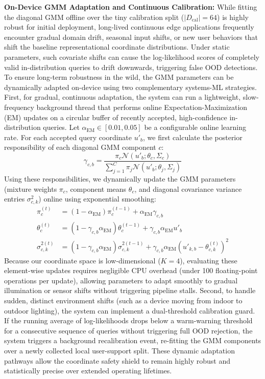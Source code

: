 \textbf{On-Device GMM Adaptation and Continuous Calibration:} While fitting the diagonal GMM offline over the tiny calibration split ($|D_{\text{cal}}| = 64$) is highly robust for initial deployment, long-lived continuous edge applications frequently encounter gradual domain drift, seasonal input shifts, or new user behaviors that shift the baseline representational coordinate distributions. Under static parameters, such covariate shifts can cause the log-likelihood scores of completely valid in-distribution queries to drift downwards, triggering false OOD detections. To ensure long-term robustness in the wild, the GMM parameters can be dynamically adapted on-device using two complementary systems-ML strategies. First, for gradual, continuous adaptation, the system can run a lightweight, slow-frequency background thread that performs online Expectation-Maximization (EM) updates on a circular buffer of recently accepted, high-confidence in-distribution queries. Let $\alpha_{\text{EM}} \in [0.01, 0.05]$ be a configurable online learning rate. For each accepted query coordinate $u'_b$, we first calculate the posterior responsibility of each diagonal GMM component $c$:
\begin{equation}
  \gamma_{c, b} = \frac{\pi_c \mathcal{N}(u'_b; \theta_c, \Sigma_c)}{\sum_{j=1}^C \pi_j \mathcal{N}(u'_b; \theta_j, \Sigma_j)}
\end{equation}
Using these responsibilities, we dynamically update the GMM parameters (mixture weights $\pi_c$, component means $\theta_c$, and diagonal covariance variance entries $\sigma_{c, k}^2$) online using exponential smoothing:
\begin{align}
  \pi_c^{(t)} &= (1 - \alpha_{\text{EM}}) \pi_c^{(t-1)} + \alpha_{\text{EM}} \gamma_{c, b} \\
  \theta_c^{(t)} &= (1 - \gamma_{c, b} \alpha_{\text{EM}}) \theta_c^{(t-1)} + \gamma_{c, b} \alpha_{\text{EM}} u'_b \\
  \sigma_{c, k}^{2 (t)} &= (1 - \gamma_{c, b} \alpha_{\text{EM}}) \sigma_{c, k}^{2 (t-1)} + \gamma_{c, b} \alpha_{\text{EM}} (u'_{k, b} - \theta_{c, k}^{(t)})^2
\end{align}
Because our coordinate space is low-dimensional ($K = 4$), evaluating these element-wise updates requires negligible CPU overhead (under 100 floating-point operations per update), allowing parameters to adapt smoothly to gradual illumination or sensor shifts without triggering pipeline stalls. Second, to handle sudden, distinct environment shifts (such as a device moving from indoor to outdoor lighting), the system can implement a dual-threshold calibration guard. If the running average of log-likelihoods drops below a warm-warning threshold for a consecutive sequence of queries without triggering full OOD rejection, the system triggers a background recalibration event, re-fitting the GMM components over a newly collected local user-support split. These dynamic adaptation pathways allow the coordinate safety shield to remain highly robust and statistically precise over extended operating lifetimes.

